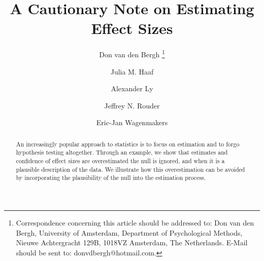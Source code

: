 \documentclass[a4paper]{article}
\title{A Cautionary Note on Estimating Effect Sizes}
\author[1]{Don van den Bergh%
	\thanks{Correspondence concerning this article should be addressed to: Don van den Bergh, University of Amsterdam, Department of Psychological Methods, Nieuwe Achtergracht 129B, 1018VZ Amsterdam, The Netherlands. E-Mail should be sent to: donvdbergh@hotmail.com.
}}
\author[1]{Julia M. Haaf}
\author[1,2]{Alexander Ly}
\author[3]{\authorcr Jeffrey N. Rouder} %
\author[1]{Eric-Jan Wagenmakers}
\affil[1]{University of Amsterdam}
\affil[2]{Centrum Wiskunde \& Informatica}
\affil[3]{University of California Irvine}
\date{}
\begin{document}
\tbEffectSizeExample
{}\reanalysis


\maketitle

\begin{abstract}
	An increasingly popular approach to statistics is to focus on estimation and to forgo hypothesis testing altogether. Through an example, we show that estimates and confidence of effect sizes are overestimated the null is ignored, and when it is a plausible description of the data. We illustrate how this overestimation can be avoided by incorporating the plausibility of the null into the estimation process.
\end{abstract}
\end{document}

